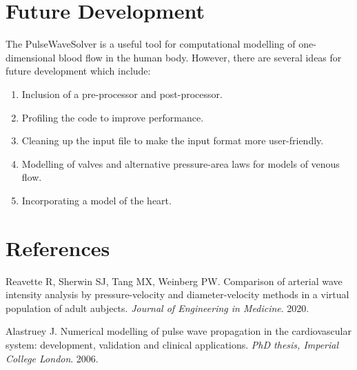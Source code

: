\section{Future Development}
The PulseWaveSolver is a useful tool for computational modelling of
one-dimensional blood flow in the human body. However, there are several ideas
for future development which include:
\begin{enumerate}
\item Inclusion of a pre-processor and post-processor.
\item Profiling the code to improve performance.
\item Cleaning up the input file to make the input format more user-friendly.
\item Modelling of valves and alternative pressure-area laws for models of
venous flow.
\item Incorporating a model of the heart.
\end{enumerate}

\section{References}

\noindent [1] Reavette R, Sherwin SJ, Tang MX, Weinberg PW. Comparison of arterial wave intensity analysis by pressure-velocity and diameter-velocity methods in a virtual population of adult aubjects.\textit{ Journal of Engineering in Medicine}. 2020.

\noindent [2] Alastruey J. Numerical modelling of pulse wave propagation in the cardiovascular system: development, validation and clinical applications. \textit{PhD thesis, Imperial College London}. 2006.

